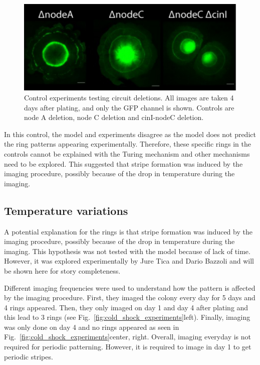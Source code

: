 \begin{figure}[H] %
    \centering
    \begin{adjustbox}{center}
        \includegraphics[width=1.1\textwidth]{chapters/Chapter 3/experimental_node_dele} %
    \end{adjustbox}
    \caption{Control experiments testing circuit deletions. All images are taken 4 days after plating, and only the GFP channel is shown. Controls are node A deletion, node C deletion and cinI-nodeC deletion.}
    \label{fig:experimental_node_dele}
\end{figure}

In this control, the model and experiments disagree as the model does not predict the ring patterns appearing experimentally.
Therefore, these specific rings in the controls cannot be explained with the Turing mechanism and other mechanisms need to be explored.
This suggested that stripe formation was induced by the imaging procedure, possibly because of the drop in temperature during the imaging.
\subsection{Temperature variations}
A potential explanation for the rings is that stripe formation was induced by the imaging procedure, possibly because of the drop in temperature during the imaging.
This hypothesis was not tested with the model because of lack of time.
However, it was explored experimentally by Jure Tica and Dario Bazzoli and will be shown here for story completeness.

Different imaging frequencies were used to understand how the pattern is affected by the imaging procedure.
First, they imaged the colony every day for 5 days and 4 rings appeared.
Then, they only imaged on day 1 and day 4 after plating and this lead to 3 rings (see Fig.~\ref{fig:cold_shock_experiments}left).
Finally, imaging was only done on day 4 and no rings appeared as seen in Fig.~\ref{fig:cold_shock_experiments}center, right.
Overall, imaging everyday is not required for periodic patterning.
However, it is required to image in day 1 to get periodic stripes.



